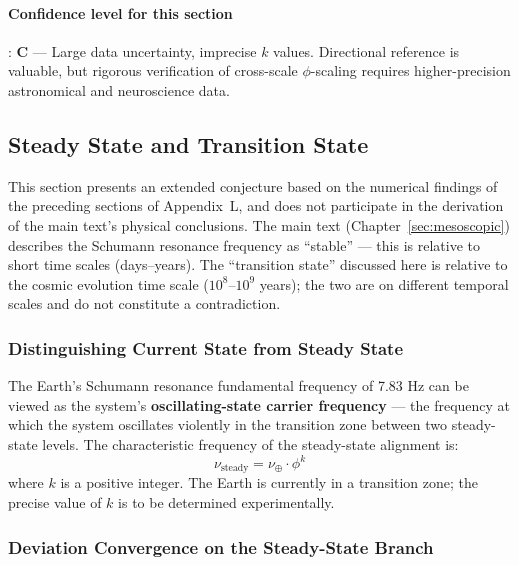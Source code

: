 \paragraph{Confidence level for this section}: \textbf{C} --- Large data uncertainty, imprecise $k$ values. Directional reference is valuable, but rigorous verification of cross-scale $\phi$-scaling requires higher-precision astronomical and neuroscience data.

\subsection{Steady State and Transition State}
\label{subsec:steady_transition}

\begin{remark}
This section presents an extended conjecture based on the numerical findings of the preceding sections of Appendix~L, and does not participate in the derivation of the main text's physical conclusions. The main text (Chapter~\ref{sec:mesoscopic}) describes the Schumann resonance frequency as ``stable'' --- this is relative to short time scales (days--years). The ``transition state'' discussed here is relative to the cosmic evolution time scale ($10^8$--$10^9$ years); the two are on different temporal scales and do not constitute a contradiction.
\end{remark}

\subsubsection{Distinguishing Current State from Steady State}

\begin{remark}
The Earth's Schumann resonance fundamental frequency of 7.83 Hz can be viewed as the system's \textbf{oscillating-state carrier frequency} --- the frequency at which the system oscillates violently in the transition zone between two steady-state levels. The characteristic frequency of the steady-state alignment is:
\begin{equation}
\nu_{\text{steady}} = \nu_{\oplus} \cdot \phi^k
\label{eq:steady_freq_en}
\end{equation}
where $k$ is a positive integer. The Earth is currently in a transition zone; the precise value of $k$ is to be determined experimentally.
\end{remark}

\subsubsection{Deviation Convergence on the Steady-State Branch}

